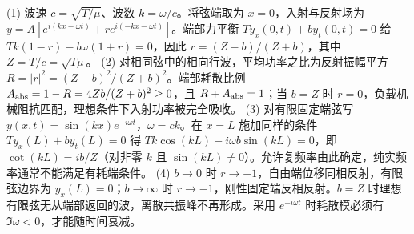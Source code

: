 (1) 波速 \(c=\sqrt{T/\mu}\)、波数 \(k=\omega/c\)。将弦端取为 \(x=0\)，入射与反射场为 \(y=A[e^{i(kx-\omega t)}+r e^{i(-kx-\omega t)}]\)。端部力平衡 \(T y_x(0,t)+b y_t(0,t)=0\) 给 \(Tk(1-r)-b\omega(1+r)=0\)，因此 \(r=(Z-b)/(Z+b)\)，其中 \(Z=T/c=\sqrt{T\mu}\)。
(2) 对相同弦中的相向行波，平均功率之比为反射振幅平方 \(R=|r|^2=(Z-b)^2/(Z+b)^2\)。端部耗散比例 \(A_{\rm abs}=1-R=4Zb/(Z+b)^2\ge0\)，且 \(R+A_{\rm abs}=1\)；当 \(b=Z\) 时 \(r=0\)，负载机械阻抗匹配，理想条件下入射功率被完全吸收。
(3) 对有限固定端弦写 \(y(x,t)=\sin(kx)e^{-i\omega t}\)，\(\omega=ck\)。在 \(x=L\) 施加同样的条件 \(T y_x(L)+b y_t(L)=0\) 得 \(Tk\cos(kL)-i\omega b\sin(kL)=0\)，即 \(\cot(kL)=i b/Z\)（对非零 \(k\) 且 \(\sin(kL)\ne0\)）。允许复频率由此确定，纯实频率通常不能满足有耗端条件。
(4) \(b\to0\) 时 \(r\to+1\)，自由端位移同相反射，有限弦边界为 \(y_x(L)=0\)；\(b\to\infty\) 时 \(r\to-1\)，刚性固定端反相反射。\(b=Z\) 时理想有限弦无从端部返回的波，离散共振峰不再形成。采用 \(e^{-i\omega t}\) 时耗散模必须有 \(\Im\omega<0\)，才能随时间衰减。
